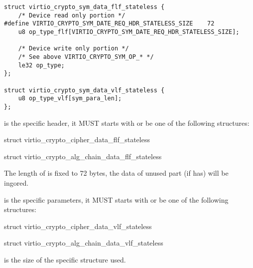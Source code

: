 \begin{lstlisting}
struct virtio_crypto_sym_data_flf_stateless {
    /* Device read only portion */
#define VIRTIO_CRYPTO_SYM_DATE_REQ_HDR_STATELESS_SIZE    72
    u8 op_type_flf[VIRTIO_CRYPTO_SYM_DATE_REQ_HDR_STATELESS_SIZE];

    /* Device write only portion */
    /* See above VIRTIO_CRYPTO_SYM_OP_* */
    le32 op_type;
};

struct virtio_crypto_sym_data_vlf_stateless {
    u8 op_type_vlf[sym_para_len];
};
\end{lstlisting}

 is the  specific header, it MUST starts
with or be one of the following structures:
\begin{itemize*}
\item struct virtio_crypto_cipher_data_flf_stateless
\item struct virtio_crypto_alg_chain_data_flf_stateless
\end{itemize*}

The length of  is fixed to 72 bytes, the data of unused
part (if has) will be ingored.

 is the  specific parameters, it MUST starts
with or be one of the following structures:
\begin{itemize*}
\item struct virtio_crypto_cipher_data_vlf_stateless
\item struct virtio_crypto_alg_chain_data_vlf_stateless
\end{itemize*}

 is the size of the specific structure used.


